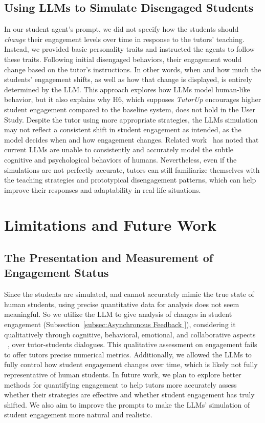 \subsection{Using LLMs to Simulate Disengaged Students}
\label{subsec:simulateEngagement}

In our student agent's prompt, we did not specify how the students should \textit{change} their engagement levels over time in response to the tutors' teaching. Instead, we provided basic personality traits and instructed the agents to follow these traits. Following initial disengaged behaviors, their engagement would change based on the tutor's instructions. In other words, when and how much the students' engagement shifts, as well as how that change is displayed, is entirely determined by the LLM. This approach explores how LLMs model human-like behavior, but it also explains why H6, which supposes \textit{TutorUp} encourages higher student engagement compared to the baseline system, does not hold in the User Study. Despite the tutor using more appropriate strategies, the LLMs simulation may not reflect a consistent shift in student engagement as intended, as the model decides when and how engagement changes. Related work~\cite{shu2023you} has noted that current LLMs are unable to consistently and accurately model the subtle cognitive and psychological behaviors of humans. Nevertheless, even if the simulations are not perfectly accurate, tutors can still familiarize themselves with the teaching strategies and prototypical disengagement patterns, which can help improve their responses and adaptability in real-life situations. 



\section{Limitations and Future Work}

\subsection{The Presentation and Measurement of Engagement Status}
Since the students are simulated, and cannot accurately mimic the true state of human students, using precise quantitative data for analysis does not seem meaningful. So we utilize the LLM to give analysis of changes in student engagement (Subsection~\ref{subsec:Asynchronous Feedback }), considering it qualitatively through cognitive, behavioral, emotional, and collaborative aspects ~\cite{joshi2022behavioral}, over tutor-students dialogues. This qualitative assessment on engagement fails to offer tutors precise numerical metrics. Additionally, we allowed the LLMs to fully control how student engagement changes over time, which is likely not fully representative of human students. In future work, we plan to explore better methods for quantifying engagement to help tutors more accurately assess whether their strategies are effective and whether student engagement has truly shifted. We also aim to improve the prompts to make the LLMs’ simulation of student engagement more natural and realistic.


